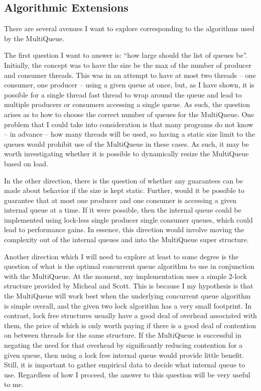 \documentclass[12pt]{report}
\begin{document}
\subsection{Algorithmic Extensions}
There are several avenues I want to explore corresponding to the algorithms
used by the MultiQueue.

The first question I want to answer is: ``how large should the list of queues
be''. Initially, the concept was to have the size be the max of the number of
producer and consumer threads. This was in an attempt to have at most two
threads -- one consumer, one producer -- using a given queue at once, but, as I
have shown, it is possible for a single thread fast thread to wrap around the
queue and lead to multiple producers or consumers accessing a single queue. As
such, the question arises as to how to choose the correct number of queues for
the MultiQueue. One problem that I could take into consideration is that many
programs do not know -- in advance -- how many threads will be used, so having
a static size limit to the queues would prohibit use of the MultiQueue in these
cases. As such, it may be worth investigating whether it is possible to
dynamically resize the MultiQueue based on load.

In the other direction, there is the question of whether any guarantees can be
made about behavior if the size is kept static. Further, would it be possible
to guarantee that at most one producer and one consumer is accessing a given
internal queue at a time. If it were possible, then the internal queue could be
implemented using lock-less single producer single consumer queues, which could
lead to performance gains. In essence, this direction would involve moving the
complexity out of the internal queues and into the MultiQueue super structure.

Another direction which I will need to explore at least to some degree is the
question of what is the optimal concurrent queue algorithm to use in
conjunction with the MultiQueue. At the moment, my implementation uses a simple
2-lock structure provided by Micheal and Scott\cite{michael1996}. This is
because I my hypothesis is that the MultiQueue will work best when the
underlying concurrent queue algorithm is simple overall, and the given two lock
algorithm has a very small footprint. In contrast, lock free structures usually
have a good deal of overhead associated with them, the price of which is only
worth paying if there is a good deal of contention on between threads for the
same structure. If the MultiQueue is successful in negating the need for that
overhead by significantly reducing contention for a given queue, then using a
lock free internal queue would provide little benefit. Still, it is important
to gather empirical data to decide what internal queue to use. Regardless of
how I proceed, the answer to this question will be very useful to me.
\end{document}
